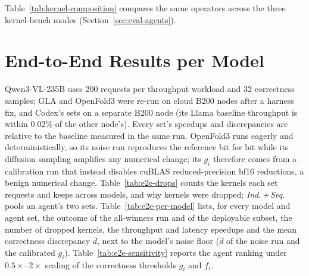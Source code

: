 Table~\ref{tab:kernel-composition} compares the same operators across the three kernel-bench modes (Section~\ref{sec:eval-agents}).

\begin{table}[H]
  \centering
  \caption{\textbf{Composition effect and sequential generation}, over operators correct in both modes ($n$).
  \emph{Ratio}: geometric mean of the per-operator speedup ratio (composed / independent, or sequential / composed).
  \emph{Broke}: independent winners that fail correctness once composed.}
  \label{tab:kernel-composition}
  \small
  \setlength{\tabcolsep}{3pt}
  
\end{table}

\section{End-to-End Results per Model}
\label{app:e2e}

Qwen3-VL-235B uses 200 requests per throughput workload and 32 correctness samples; GLA and OpenFold3 were re-run on cloud B200 nodes after a harness fix, and Codex's sets on a separate B200 node (its Llama baseline throughput is within 0.02\% of the other node's). Every set's speedups and discrepancies are relative to the baseline measured in the same run.
OpenFold3 runs eagerly and deterministically, so its noise run reproduces the reference bit for bit while its diffusion sampling amplifies any numerical change; its $g_i$ therefore comes from a calibration run that instead disables cuBLAS reduced-precision bf16 reductions, a benign numerical change.
Table~\ref{tab:e2e-drops} counts the kernels each set requests and keeps across models, and why kernels were dropped; \emph{Ind.\,+\,Seq.} pools an agent's two sets.
Table~\ref{tab:e2e-per-model} lists, for every model and agent set, the outcome of the all-winners run and of the deployable subset, the number of dropped kernels, the throughput and latency speedups and the mean correctness discrepancy $\bar d$, next to the model's noise floor ($\bar d$ of the noise run and the calibrated $g_i$).
Table~\ref{tab:e2e-sensitivity} reports the agent ranking under $0.5\times$--$2\times$ scaling of the correctness thresholds $g_i$ and $f_i$.

\begin{table}[H]
  \centering
  \caption{\textbf{Why kernel-level winners are dropped end to end.} Kernels are counted per (model, kernel) pair.
  Causes: \emph{Comp.}: breaks the compilation stack (not traceable by \texttt{torch.compile}, or breaks dynamic shapes); \emph{Run.}: crashes at run time on real engine shapes; \emph{T/O}: hangs; \emph{Imp.}: fails to import; \emph{Inc.}: runs but produces wrong outputs.
  \emph{AW crash / broken}: models where the full winner set crashes / runs with wrong outputs; \emph{Not conv.}: no deployable subset found within the attempt budget.}
  \label{tab:e2e-drops}
  \small
  \setlength{\tabcolsep}{3pt}
  \resizebox{\linewidth}{!}{}
\end{table}

